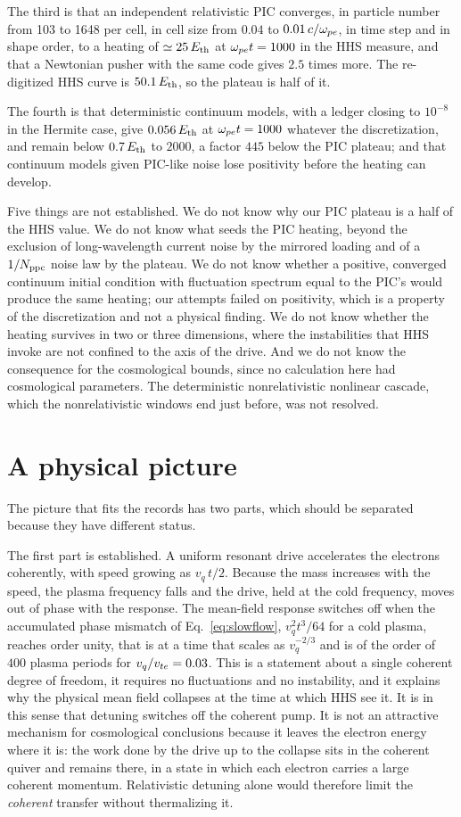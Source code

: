 The third is that an independent relativistic PIC converges, in particle number from 103 to 1648 per cell, in cell size from $0.04$ to $0.01\,c/\omega_{pe}$, in time step and in shape order, to a heating of $\simeq25\,E_{\rm th}$ at $\omega_{pe} t=1000$ in the HHS measure, and that a Newtonian pusher with the same code gives $2.5$ times more. The re-digitized HHS curve is $50.1\,E_{\rm th}$, so the plateau is half of it.

The fourth is that deterministic continuum models, with a ledger closing to $10^{-8}$ in the Hermite case, give $0.056\,E_{\rm th}$ at $\omega_{pe} t=1000$ whatever the discretization, and remain below $0.7\,E_{\rm th}$ to $2000$, a factor $445$ below the PIC plateau; and that continuum models given PIC-like noise lose positivity before the heating can develop.

Five things are not established. We do not know why our PIC plateau is a half of the HHS value. We do not know what seeds the PIC heating, beyond the exclusion of long-wavelength current noise by the mirrored loading and of a $1/N_{\rm ppc}$ noise law by the plateau. We do not know whether a positive, converged continuum initial condition with fluctuation spectrum equal to the PIC's would produce the same heating; our attempts failed on positivity, which is a property of the discretization and not a physical finding. We do not know whether the heating survives in two or three dimensions, where the instabilities that HHS invoke are not confined to the axis of the drive. And we do not know the consequence for the cosmological bounds, since no calculation here had cosmological parameters. The deterministic nonrelativistic nonlinear cascade, which the nonrelativistic windows end just before, was not resolved.

\section{A physical picture}

The picture that fits the records has two parts, which should be separated because they have different status.

The first part is established. A uniform resonant drive accelerates the electrons coherently, with speed growing as $v_q\,t/2$. Because the mass increases with the speed, the plasma frequency falls and the drive, held at the cold frequency, moves out of phase with the response. The mean-field response switches off when the accumulated phase mismatch of Eq.~\eqref{eq:slowflow}, $v_q^2t^3/64$ for a cold plasma, reaches order unity, that is at a time that scales as $v_q^{-2/3}$ and is of the order of $400$ plasma periods for $v_q/v_{te}=0.03$. This is a statement about a single coherent degree of freedom, it requires no fluctuations and no instability, and it explains why the physical mean field collapses at the time at which HHS see it. It is in this sense that detuning switches off the coherent pump. It is not an attractive mechanism for cosmological conclusions because it leaves the electron energy where it is: the work done by the drive up to the collapse sits in the coherent quiver and remains there, in a state in which each electron carries a large coherent momentum. Relativistic detuning alone would therefore limit the \emph{coherent} transfer without thermalizing it.

